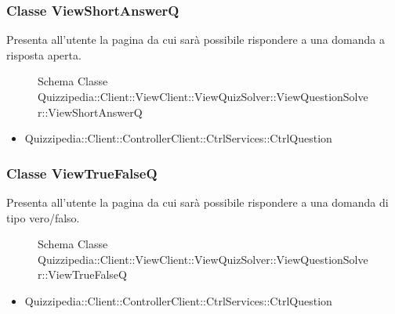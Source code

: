 \subsubsection{Classe ViewShortAnswerQ}
Presenta all'utente la pagina da cui sarà possibile rispondere a una domanda a risposta aperta.
\begin{figure}[H]
\centering
\noindent{}
\caption{Schema Classe Quizzipedia::Client::ViewClient::ViewQuizSolver::ViewQuestionSolver::ViewShortAnswerQ}
\end{figure}
\begin{itemize}
\item Quizzipedia::Client::ControllerClient::CtrlServices::CtrlQuestion
\end{itemize}
\subsubsection{Classe ViewTrueFalseQ}
Presenta all'utente la pagina da cui sarà possibile rispondere a una domanda di tipo vero/falso.
\begin{figure}[H]
\centering
\noindent{}
\caption{Schema Classe Quizzipedia::Client::ViewClient::ViewQuizSolver::ViewQuestionSolver::ViewTrueFalseQ}
\end{figure}
\begin{itemize}
\item Quizzipedia::Client::ControllerClient::CtrlServices::CtrlQuestion
\end{itemize}
